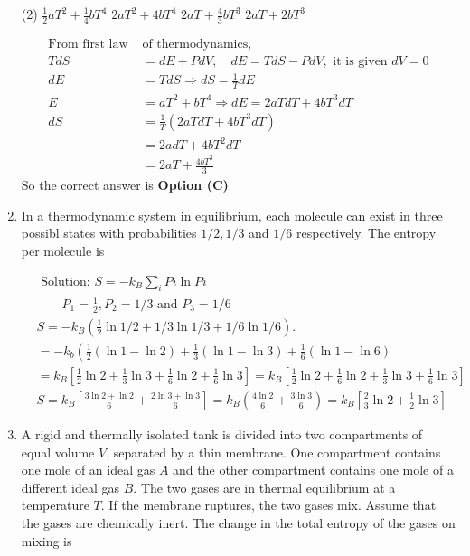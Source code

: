 \begin{enumerate}
\begin{tasks}(2)
\task[\textbf{A.}] $\frac{1}{2} a T^{2}+\frac{1}{4} b T^{4}$
\task[\textbf{B.}] $2 a T^{2}+4 b T^{4}$
\task[\textbf{C.}] $2 a T+\frac{4}{3} b T^{3}$
\task[\textbf{D.}] $2 a T+2 b T^{3}$
\end{tasks}
\begin{answer}
$$\begin{aligned}	
\text{From first law }&\text{of thermodynamics,}\\
T d S&=d E+P d V, \quad d E=T d S-P d V,\text{ it is given }d V=0\\
d E&=T d S \Rightarrow d S=\frac{1}{T} d E\\
E&=a T^{2}+b T^{4} \Rightarrow d E=2 a T d T+4 b T^{3} d T\\
d S&=\frac{1}{T}\left(2 a T d T+4 b T^{3} d T\right)\\&=2 a d T+4 b T^{2} d T\\&=2 a T+\frac{4 b T^{3}}{3}
\end{aligned}$$	
So the correct answer is \textbf{Option (C)}
\end{answer}	
\item In a thermodynamic system in equilibrium, each molecule can exist in three possibl states with probabilities $1 / 2,1 / 3$ and $1 / 6$ respectively. The entropy per molecule is
\begin{answer}
	$$\begin{aligned}	
	&\text { Solution: } S=-k_{B} \sum_{i} P i \ln P i \\
	&\qquad P_{1}=\frac{1}{2}, P_{2}=1 / 3 \text { and } P_{3}=1 / 6 \\
	&S=-k_{B}\left(\frac{1}{2} \ln 1 / 2+1 / 3 \ln 1 / 3+1 / 6 \ln 1 / 6\right) . \\
	&=-k_{b}\left(\frac{1}{2}(\ln 1-\ln 2)+\frac{1}{3}(\ln 1-\ln 3)+\frac{1}{6}(\ln 1-\ln 6)\right. \\
	&=k_{B}\left[\frac{1}{2} \ln 2+\frac{1}{3} \ln 3+\frac{1}{6} \ln 2+\frac{1}{6} \ln 3\right]=k_{B}\left[\frac{1}{2} \ln 2+\frac{1}{6} \ln 2+\frac{1}{3} \ln 3+\frac{1}{6} \ln 3\right] \\
	&S=k_{B}\left[\frac{3 \ln 2+\ln 2}{6}+\frac{2 \ln 3+\ln 3}{6}\right]=k_{B}\left(\frac{4 \ln 2}{6}+\frac{3 \ln 3}{6}\right)=k_{B}\left[\frac{2}{3} \ln 2+\frac{1}{2} \ln 3\right]
	\end{aligned}$$	
\end{answer}
	\item A rigid and thermally isolated tank is divided into two compartments of equal volume $V$, separated by a thin membrane. One compartment contains one mole of an ideal gas $A$ and the other compartment contains one mole of a different ideal gas $B$. The two gases are in thermal equilibrium at a temperature $T$. If the membrane ruptures, the two gases mix. Assume that the gases are chemically inert. The change in the total entropy of the gases on mixing is


\end{enumerate}
